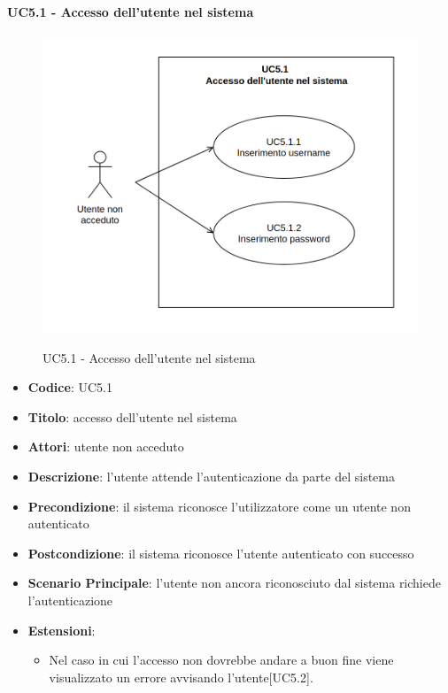 	\paragraph{UC5.1 - Accesso dell'utente nel sistema}
		\begin{figure}[H]
			\centering
				\includegraphics[width=\columnwidth]{img/UC5_1.png}\\
			\caption{UC5.1 - Accesso dell'utente nel sistema}
		\end{figure}
		\begin{itemize}
			\item \textbf{Codice}: UC5.1
			\item \textbf{Titolo}: accesso dell'utente nel sistema
			\item \textbf{Attori}: utente non acceduto
			\item \textbf{Descrizione}: l'utente attende l'autenticazione da parte del sistema
			\item \textbf{Precondizione}: il sistema riconosce l'utilizzatore come un utente non autenticato
			\item \textbf{Postcondizione}: il sistema riconosce l'utente autenticato con successo
			\item \textbf{Scenario Principale}: l’utente non ancora riconosciuto dal sistema richiede l'autenticazione
			\item \textbf{Estensioni}:
			\begin{itemize}
				\item Nel caso in cui l'accesso non dovrebbe andare a buon fine viene visualizzato un errore avvisando l'utente[UC5.2].
			\end{itemize}
	\end{itemize}

